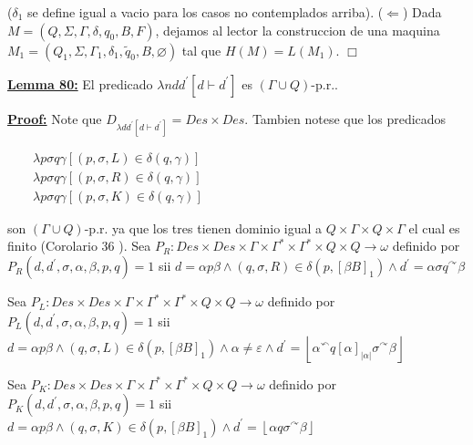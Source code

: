 (\(\delta _{1}\) se define igual a vacio para los casos no contemplados arriba).
(\(\Leftarrow \)) Dada \(M=(Q,\Sigma ,\Gamma ,\delta ,q_{0},B,F)\), dejamos al lector la construccion de una maquina \(M_{1}=(Q_{1},\Sigma ,\Gamma _{1},\delta _{1},\tilde{q}_{0},B,\varnothing )\) tal que \(H(M)=L(M_{1})\). \(\Box\)


\textbf{\underline{Lemma 80:}} El predicado \(\lambda ndd^{\prime }\left[ d\vdash d^{\prime }\right] \) es \( (\Gamma \cup Q)\)-p.r..

\textbf{\underline{Proof:}} Note que \(D_{\lambda dd^{\prime }\left[ d\vdash d^{\prime }\right] }=Des\times Des\). Tambien notese que los predicados

\(\displaystyle \begin{array}{rcl} & & \lambda p\sigma q\gamma \left[ (p,\sigma ,L)\in \delta (q,\gamma )\right] \\ & & \lambda p\sigma q\gamma \left[ (p,\sigma ,R)\in \delta (q,\gamma )\right] \\ & & \lambda p\sigma q\gamma \left[ (p,\sigma ,K)\in \delta (q,\gamma )\right] \end{array} \)

son \((\Gamma \cup Q)\)-p.r. ya que los tres tienen dominio igual a \(Q\times \Gamma \times Q\times \Gamma \) el cual es finito (Corolario 36 ). Sea \(P_{R}:Des\times Des\times \Gamma \times \Gamma ^{\ast }\times \Gamma ^{\ast }\times Q\times Q\rightarrow \omega \) definido por \(P_{R}(d,d^{\prime },\sigma ,\alpha ,\beta ,p,q)=1\) sii
\(\displaystyle d=\alpha p\beta \wedge (q,\sigma ,R)\in \delta \left( p,\left[ \beta B\right] _{1}\right) \wedge d^{\prime }=\alpha \sigma q^{\curvearrowright }\beta \)

Sea \(P_{L}:Des\times Des\times \Gamma \times \Gamma ^{\ast }\times \Gamma ^{\ast }\times Q\times Q\rightarrow \omega \) definido por \(P_{L}(d,d^{\prime },\sigma ,\alpha ,\beta ,p,q)=1\) sii
\(\displaystyle d=\alpha p\beta \wedge (q,\sigma ,L)\in \delta \left( p,\left[ \beta B\right] _{1}\right) \wedge \alpha \neq \varepsilon \wedge d^{\prime }=\left\lfloor \alpha ^{\curvearrowleft }q\left[ \alpha \right] _{\left\vert \alpha \right\vert }\sigma ^{\curvearrowright }\beta \right\rfloor \)

Sea \(P_{K}:Des\times Des\times \Gamma \times \Gamma ^{\ast }\times \Gamma ^{\ast }\times Q\times Q\rightarrow \omega \) definido por \(P_{K}(d,d^{\prime },\sigma ,\alpha ,\beta ,p,q)=1\) sii
\(\displaystyle d=\alpha p\beta \wedge (q,\sigma ,K)\in \delta \left( p,\left[ \beta B\right] _{1}\right) \wedge d^{\prime }=\left\lfloor \alpha q\sigma ^{\curvearrowright }\beta \right\rfloor \)

